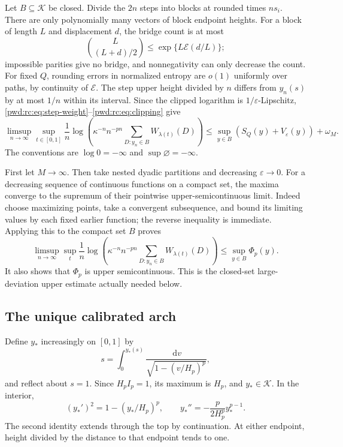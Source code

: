 \documentclass[11pt,letterpaper]{article}
\numberwithin{equation}{section}
\theoremstyle{remark}\newtheorem{remark}[theorem]{Remark}
\newcommand{\K}{\mathcal K}\newcommand{\ee}{\mathrm e}\newcommand{\dd}{\,\mathrm d}
\begin{document}
Let $B\subseteq\K$ be closed. Divide the $2n$ steps into blocks at rounded times $ns_i$. There are only polynomially many vectors of block endpoint heights. For a block of length $L$ and displacement $d$, the bridge count is at most
\[
 \binom{L}{(L+d)/2}\le\exp\{L\mathcal E(d/L)\};
\]
impossible parities give no bridge, and nonnegativity can only decrease the count. For fixed $Q$, rounding errors in normalized entropy are $o(1)$ uniformly over paths, by continuity of $\mathcal E$. The step upper height divided by $n$ differs from $y_n(s)$ by at most $1/n$ within its interval. Since the clipped logarithm is $1/\varepsilon$-Lipschitz, \eqref{pwd:rc:eq:step-weight}--\eqref{pwd:rc:eq:clipping} give
\begin{equation}\label{pwd:rc:eq:clipped-upper}
 \limsup_{n\to\infty}\sup_{t\in[0,1]}\frac1n
 \log\left(\kappa^{-n}n^{-pn}\sum_{D:y_n\in B}W_{\lambda(t)}(D)\right)
 \le\sup_{y\in B}(S_Q(y)+V_\varepsilon(y))+\omega_M.
\end{equation}
The conventions are $\log0=-\infty$ and $\sup\varnothing=-\infty$.

First let $M\to\infty$. Then take nested dyadic partitions and decreasing $\varepsilon\to0$. For a decreasing sequence of continuous functions on a compact set, the maxima converge to the supremum of their pointwise upper-semicontinuous limit. Indeed choose maximizing points, take a convergent subsequence, and bound its limiting values by each fixed earlier function; the reverse inequality is immediate. Applying this to the compact set $B$ proves
\begin{equation}\label{pwd:rc:eq:closed-upper}
 \limsup_{n\to\infty}\sup_t\frac1n
 \log\left(\kappa^{-n}n^{-pn}\sum_{D:y_n\in B}W_{\lambda(t)}(D)\right)
 \le\sup_{y\in B}\Phi_p(y).
\end{equation}
It also shows that $\Phi_p$ is upper semicontinuous. This is the closed-set large-deviation upper estimate actually needed below.

\subsection{The unique calibrated arch}
Define $y_*$ increasingly on $[0,1]$ by
\begin{equation}\label{pwd:rc:eq:arch-definition}
 s=\int_0^{y_*(s)}\frac{\dd v}{\sqrt{1-(v/H_p)^p}},
\end{equation}
and reflect about $s=1$. Since $H_pI_p=1$, its maximum is $H_p$, and $y_*\in\K$. In the interior,
\begin{equation}\label{pwd:rc:eq:arch-equations}
 (y_*')^2=1-(y_*/H_p)^p,\qquad
 y_*''=-\frac p{2H_p^p}y_*^{p-1}.
\end{equation}
The second identity extends through the top by continuation. At either endpoint, height divided by the distance to that endpoint tends to one.
\end{document}
